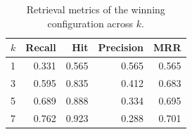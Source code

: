 \begin{table}[htbp]
  \centering
  \caption{Retrieval metrics of the winning configuration across $k$.}
  \label{tab:retrieval-topk}
  \begin{tabular}{lrrrr}
    \toprule
    $k$ & Recall & Hit & Precision & MRR \\
    \midrule
    1 & 0.331 & 0.565 & 0.565 & 0.565 \\
    3 & 0.595 & 0.835 & 0.412 & 0.683 \\
    5 & 0.689 & 0.888 & 0.334 & 0.695 \\
    7 & 0.762 & 0.923 & 0.288 & 0.701 \\
    \bottomrule
  \end{tabular}
\end{table}

